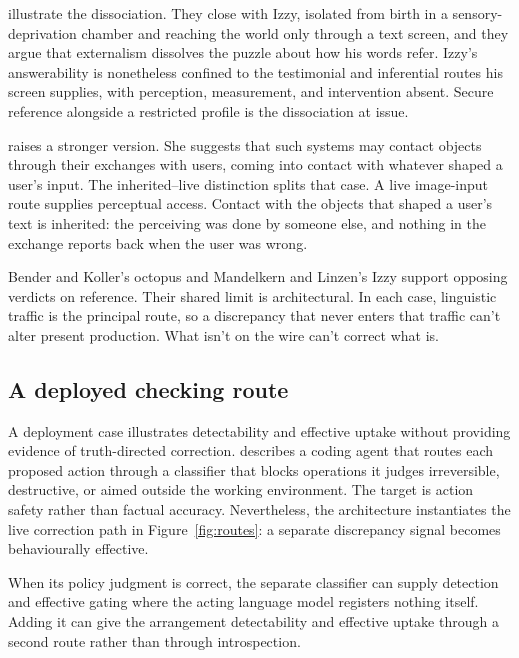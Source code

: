 \documentclass[12pt]{article}
\begin{document}
\textcite{mandelkern_linzen_2024_do_language_models_words_refer} illustrate the dissociation. They
close with Izzy, isolated from
birth in a sensory-deprivation chamber and reaching the world only through a text screen,
and they argue that externalism dissolves the puzzle about how his words
refer. Izzy's
answerability is nonetheless confined to the testimonial and inferential routes his screen
supplies, with perception, measurement, and intervention absent. Secure reference
alongside a restricted profile is the dissociation at issue.

\textcite{pepp_2025_reference_without_intentions_llms} raises a stronger version. She
suggests that such systems may contact objects
through their exchanges with users, coming into contact with whatever shaped a user's
input. The inherited--live distinction splits that case. A live image-input route supplies
perceptual access. Contact with the objects that shaped a user's
text is inherited: the perceiving
was done by someone else, and nothing in the exchange reports back when the user was
wrong.

Bender and Koller's octopus and Mandelkern and Linzen's Izzy support opposing verdicts on
reference. Their shared limit is architectural. In each case, linguistic
traffic is the principal route, so a discrepancy that never enters that traffic can't
alter present production. What isn't on the wire can't correct what is.

\subsection{A deployed checking route}\label{ssec:deployment}

A deployment case illustrates detectability and effective uptake without providing
evidence of truth-directed correction. \textcite{anthropic2026automode} describes a coding
agent that routes each proposed action through a classifier that blocks operations it judges
irreversible, destructive, or aimed outside the working environment. The target is action
safety rather than factual accuracy. Nevertheless, the architecture instantiates the live
correction path in Figure~\ref{fig:routes}: a separate discrepancy signal becomes
behaviourally effective.

When its policy judgment is correct, the separate classifier can supply detection and
effective gating where the acting language model registers nothing itself. Adding it can
give the arrangement detectability and effective uptake through a second route rather than
through introspection.
\end{document}
